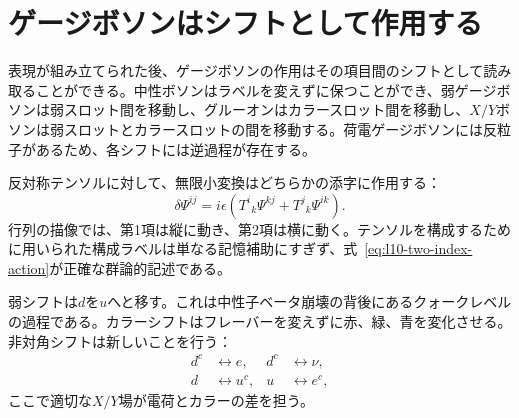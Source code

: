 \section{ゲージボソンはシフトとして作用する}

表現が組み立てられた後、ゲージボソンの作用はその項目間のシフトとして読み取ることができる。中性ボソンはラベルを変えずに保つことができ、弱ゲージボソンは弱スロット間を移動し、グルーオンはカラースロット間を移動し、\(X/Y\)ボソンは弱スロットとカラースロットの間を移動する。荷電ゲージボソンには反粒子があるため、各シフトには逆過程が存在する。

反対称テンソルに対して、無限小変換はどちらかの添字に作用する：
\begin{equation}
\delta\Psi^{ij}
=
i\epsilon
\left(
T^i{}_k\Psi^{kj}
+
T^j{}_k\Psi^{ik}
\right).
\label{eq:l10-two-index-action}
\end{equation}
行列の描像では、第1項は縦に動き、第2項は横に動く。テンソルを構成するために用いられた構成ラベルは単なる記憶補助にすぎず、式~\eqref{eq:l10-two-index-action}が正確な群論的記述である。

弱シフトは\(d\)を\(u\)へと移す。これは中性子ベータ崩壊の背後にあるクォークレベルの過程である。カラーシフトはフレーバーを変えずに赤、緑、青を変化させる。非対角シフトは新しいことを行う：
\begin{equation}
\begin{aligned}
d^c&\longleftrightarrow e,
& d^c&\longleftrightarrow\nu,\\
d&\longleftrightarrow u^c,
& u&\longleftrightarrow e^c,
\end{aligned}
\label{eq:l10-leptoquark-shifts}
\end{equation}
ここで適切な\(X/Y\)場が電荷とカラーの差を担う。

\begin{classroomqa}
\end{classroomqa}

\begin{classroomqa}
\end{classroomqa}

